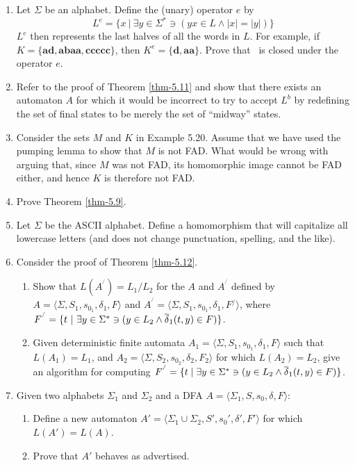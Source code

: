 \begin{enumerate}[{5.}1. ]
\item Let $\Sigma$ be an alphabet. Define the (unary) operator $e$ by
\[ L^e=\{x\ | \ \exists y \in \Sigma^* \ni (yx \in L \wedge |x|=|y|)\} \]
$L^e$ then represents the last halves of all the words in $L$. For example, if
$K=\{\pmb{ad},\pmb{abaa},\pmb{ccccc}\}$, then $K^e=\{\pmb{d},\pmb{aa}\}$. Prove
that \DSIG\ is closed under the operator $e$.

\item Refer to the proof of Theorem \ref{thm-5.11} and show that there exists an automaton
$A$ for which it would be incorrect to try to accept $L^b$ by redefining the set
of final states to be merely the set of ``midway'' states.

\item Consider the sets $M$ and $K$ in Example 5.20. Assume that we have used
the pumping lemma to show that $M$ is not FAD. What would be wrong with arguing
that, since $M$ was not FAD, its homomorphic image cannot be FAD either, and
hence $K$ is therefore not FAD.

\item Prove Theorem \ref{thm-5.9}.

\item Let $\Sigma$ be the ASCII alphabet. Define a homomorphism that will
capitalize all lowercase letters (and does not change punctuation, spelling, and
the like).

\item Consider the proof of Theorem \ref{thm-5.12}.
\begin{enumerate}
\item Show that
$L(A^{^/}) = L_1/L_2$
for the $A$ and $A^{^/}$ defined by
$A=\langle\Sigma,S_1,s_{0_1},\delta_1,F\rangle$ and
$A^{^/}=\langle\Sigma,S_1,s_{0_1},\delta_1,F{^/}\rangle$, where
$ F^{^/} =\{t\ | \ \exists y \in \Sigma^* \ni (y \in L_2 \wedge \overline{\delta}_1(t,y) \in F)\}$.
\item Given deterministic finite automata
$A_1=\langle\Sigma,S_1,s_{0_1},\delta_1,F\rangle$ such that $L(A_1) = L_1$,
and $A_2=\langle\Sigma,S_2,s_{0_2},\delta_2,F_2\rangle$ for which $L(A_2) = L_2$,
give an algorithm for computing $F^{^/}=\{t \mid \exists y \in \Sigma^* \ni (y \in L_2
\wedge \overline{\delta}_1(t,y) \in F)\}$.
\end{enumerate}

\item Given two alphabets $\Sigma_1$ and $\Sigma_2$ and a DFA
$A=\langle\Sigma_1,S,s_0,\delta,F\rangle$:
\begin{enumerate}
\item Define a new automaton $A'=\langle\Sigma_1 \cup \Sigma_2,S',s_0',\delta',
F'\rangle$ for which $L(A')=L(A)$.
\item Prove that $A'$ behaves as advertised.
\end{enumerate}


\end{enumerate}
